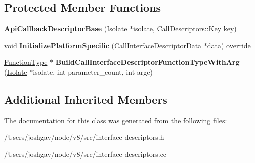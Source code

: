 \subsection*{Protected Member Functions}
\begin{DoxyCompactItemize}
\item 
{\bfseries Api\+Callback\+Descriptor\+Base} (\hyperlink{classv8_1_1internal_1_1_isolate}{Isolate} $\ast$isolate, Call\+Descriptors\+::\+Key key)\hypertarget{classv8_1_1internal_1_1_api_callback_descriptor_base_ae34ce6c137da5a8764d6fe0584a3dafa}{}\label{classv8_1_1internal_1_1_api_callback_descriptor_base_ae34ce6c137da5a8764d6fe0584a3dafa}

\item 
void {\bfseries Initialize\+Platform\+Specific} (\hyperlink{classv8_1_1internal_1_1_call_interface_descriptor_data}{Call\+Interface\+Descriptor\+Data} $\ast$data) override\hypertarget{classv8_1_1internal_1_1_api_callback_descriptor_base_a5dbf77b8fb657373ce3f0f57e127c7f2}{}\label{classv8_1_1internal_1_1_api_callback_descriptor_base_a5dbf77b8fb657373ce3f0f57e127c7f2}

\item 
\hyperlink{classv8_1_1internal_1_1_function_type}{Function\+Type} $\ast$ {\bfseries Build\+Call\+Interface\+Descriptor\+Function\+Type\+With\+Arg} (\hyperlink{classv8_1_1internal_1_1_isolate}{Isolate} $\ast$isolate, int parameter\+\_\+count, int argc)\hypertarget{classv8_1_1internal_1_1_api_callback_descriptor_base_a7767b1dd2c94c543a9b348e7cf85e5aa}{}\label{classv8_1_1internal_1_1_api_callback_descriptor_base_a7767b1dd2c94c543a9b348e7cf85e5aa}

\end{DoxyCompactItemize}
\subsection*{Additional Inherited Members}


The documentation for this class was generated from the following files\+:\begin{DoxyCompactItemize}
\item 
/\+Users/joshgav/node/v8/src/interface-\/descriptors.\+h\item 
/\+Users/joshgav/node/v8/src/interface-\/descriptors.\+cc\end{DoxyCompactItemize}
